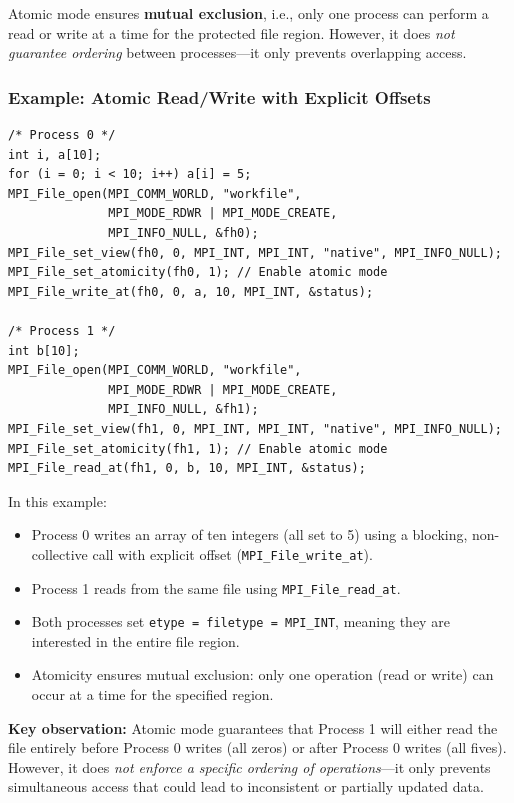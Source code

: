 \documentclass[12pt]{book}
\begin{document}
Atomic mode ensures \textbf{mutual exclusion}, i.e., only one process can perform a read or write at a time for the protected file region. However, it does \emph{not guarantee ordering} between processes—it only prevents overlapping access.

\subsubsection*{Example: Atomic Read/Write with Explicit Offsets}

\begin{lstlisting}[style=cppstyle]
/* Process 0 */
int i, a[10];
for (i = 0; i < 10; i++) a[i] = 5;
MPI_File_open(MPI_COMM_WORLD, "workfile",
              MPI_MODE_RDWR | MPI_MODE_CREATE,
              MPI_INFO_NULL, &fh0);
MPI_File_set_view(fh0, 0, MPI_INT, MPI_INT, "native", MPI_INFO_NULL);
MPI_File_set_atomicity(fh0, 1); // Enable atomic mode
MPI_File_write_at(fh0, 0, a, 10, MPI_INT, &status);

/* Process 1 */
int b[10];
MPI_File_open(MPI_COMM_WORLD, "workfile",
              MPI_MODE_RDWR | MPI_MODE_CREATE,
              MPI_INFO_NULL, &fh1);
MPI_File_set_view(fh1, 0, MPI_INT, MPI_INT, "native", MPI_INFO_NULL);
MPI_File_set_atomicity(fh1, 1); // Enable atomic mode
MPI_File_read_at(fh1, 0, b, 10, MPI_INT, &status);
\end{lstlisting}

In this example:
\begin{itemize}
    \item Process 0 writes an array of ten integers (all set to 5) using a blocking, non-collective call with explicit offset (\texttt{MPI\_File\_write\_at}).
    \item Process 1 reads from the same file using \texttt{MPI\_File\_read\_at}.
    \item Both processes set \texttt{etype = filetype = MPI\_INT}, meaning they are interested in the entire file region.
    \item Atomicity ensures mutual exclusion: only one operation (read or write) can occur at a time for the specified region.
\end{itemize}

\textbf{Key observation:} Atomic mode guarantees that Process 1 will either read the file entirely before Process 0 writes (all zeros) or after Process 0 writes (all fives).  
However, it does \emph{not enforce a specific ordering of operations}—it only prevents simultaneous access that could lead to inconsistent or partially updated data.
\end{document}

